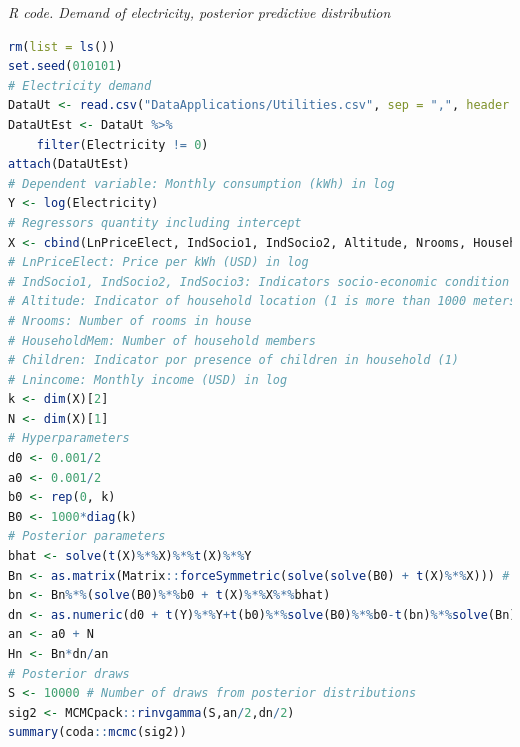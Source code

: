 \begin{tcolorbox}[enhanced,width=4.67in,center upper,
	fontupper=\large\bfseries,drop shadow southwest,sharp corners]
	\textit{R code. Demand of electricity, posterior predictive distribution}
	\begin{VF}
		\begin{lstlisting}[language=R]
rm(list = ls())
set.seed(010101)
# Electricity demand
DataUt <- read.csv("DataApplications/Utilities.csv", sep = ",", header = TRUE, fileEncoding = "latin1")
DataUtEst <- DataUt %>% 
	filter(Electricity != 0)
attach(DataUtEst)
# Dependent variable: Monthly consumption (kWh) in log
Y <- log(Electricity) 
# Regressors quantity including intercept
X <- cbind(LnPriceElect, IndSocio1, IndSocio2, Altitude, Nrooms, HouseholdMem, Children, Lnincome, 1)
# LnPriceElect: Price per kWh (USD) in log
# IndSocio1, IndSocio2, IndSocio3: Indicators socio-economic condition (1) is the lowest and (3) the highest
# Altitude: Indicator of household location (1 is more than 1000 meters above sea level)
# Nrooms: Number of rooms in house
# HouseholdMem: Number of household members
# Children: Indicator por presence of children in household (1)
# Lnincome: Monthly income (USD) in log
k <- dim(X)[2]
N <- dim(X)[1]
# Hyperparameters
d0 <- 0.001/2
a0 <- 0.001/2
b0 <- rep(0, k)
B0 <- 1000*diag(k)
# Posterior parameters
bhat <- solve(t(X)%*%X)%*%t(X)%*%Y
Bn <- as.matrix(Matrix::forceSymmetric(solve(solve(B0) + t(X)%*%X))) # Force this matrix to be symmetric
bn <- Bn%*%(solve(B0)%*%b0 + t(X)%*%X%*%bhat)
dn <- as.numeric(d0 + t(Y)%*%Y+t(b0)%*%solve(B0)%*%b0-t(bn)%*%solve(Bn)%*%bn)
an <- a0 + N
Hn <- Bn*dn/an
# Posterior draws
S <- 10000 # Number of draws from posterior distributions
sig2 <- MCMCpack::rinvgamma(S,an/2,dn/2)
summary(coda::mcmc(sig2))
\end{lstlisting}
	\end{VF}
\end{tcolorbox} 

